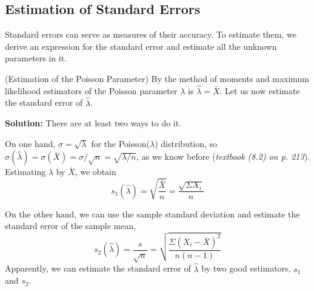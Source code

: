 \subsection{Estimation of Standard Errors}
\label{subsec:estimation-of-standard-errors}

Standard errors can serve as measures of their accuracy. To estimate them, we derive an expression for the standard error and estimate all the unknown parameters in it.

\begin{example}{ (Estimation of the Poisson Parameter)}
  By the method of moments and maximum likelihood estimators of the Poisson parameter $\lambda$ is $\hat{\lambda} = \bar{X}$. Let us now estimate the
  standard error of $\hat{\lambda}$.

  \textbf{Solution:}
  There are at least two ways to do it.

  On one hand, $\sigma = \sqrt{\lambda}$ for the Poisson($\lambda$) distribution, so $\sigma(\hat{\lambda}) = \sigma(\bar{X}) = \sigma / \sqrt{n} = \sqrt{\lambda / n}$, as we know before (\textit{textbook (8.2) on p. 213}). Estimating $\lambda$ by $\bar{X}$, we obtain
  \begin{equation*}
    s_1(\hat{\lambda}) = \sqrt{\frac{\bar{X}}{n}} = \frac{\sqrt{\Sigma X_i}}{n}
  \end{equation*}

  On the other hand, we can use the sample standard deviation and estimate the standard error of the sample mean,
  \begin{equation*}
    s_2(\hat{\lambda}) = \frac{s}{\sqrt{n}} = \sqrt{\frac{\Sigma (X_i - \bar{X})^2}{n (n-1)}}
  \end{equation*}
  Apparently, we can estimate the standard error of $\hat{\lambda}$ by two good estimators, $s_1$ and $s_2$.
\end{example}
